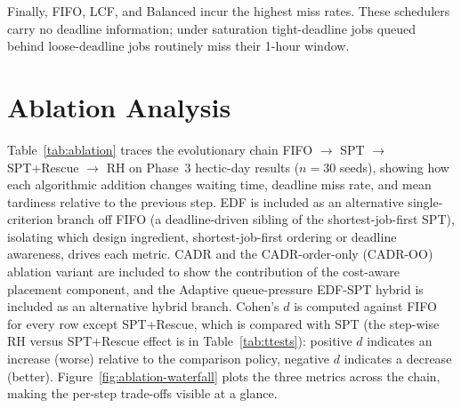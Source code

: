 {Finally, FIFO, LCF, and Balanced incur the highest miss rates. These schedulers carry no deadline information; under saturation tight-deadline jobs queued behind loose-deadline jobs routinely miss their 1-hour window.

\section{Ablation Analysis}
\label{sec:ablation-analysis}

Table~\ref{tab:ablation} traces the evolutionary chain FIFO $\to$ SPT $\to$ SPT+Rescue $\to$ RH on Phase~3 hectic-day results ($n=30$ seeds), showing how each algorithmic addition changes waiting time, deadline miss rate, and mean tardiness relative to the previous step. EDF is included as an alternative single-criterion branch off FIFO (a deadline-driven sibling of the shortest-job-first SPT), isolating which design ingredient, shortest-job-first ordering or deadline awareness, drives each metric. CADR and the CADR-order-only (CADR-OO) ablation variant are included to show the contribution of the cost-aware placement component, and the Adaptive queue-pressure EDF-SPT hybrid is included as an alternative hybrid branch. Cohen's $d$ is computed against FIFO for every row except SPT+Rescue, which is compared with SPT (the step-wise RH versus SPT+Rescue effect is in Table~\ref{tab:ttests}): positive $d$ indicates an increase (worse) relative to the comparison policy, negative $d$ indicates a decrease (better). Figure~\ref{fig:ablation-waterfall} plots the three metrics across the chain, making the per-step trade-offs visible at a glance.

\begin{table}[htbp]
\centering
\caption[Ablation analysis: evolutionary chain]{Ablation analysis: evolutionary chain on Phase~3 hectic day ($n=30$ seeds, $C_{\max}=5$, $\sim$950 jobs/day). Cohen's $d$ for SPT, EDF, RH, CADR, and Adaptive is relative to FIFO; for SPT+Rescue it is relative to SPT. The RH and CADR comparisons against SPT+Rescue are reported in Table~\ref{tab:ttests} and the Phase~3 statistics (Section~\ref{sec:phase-3-statistical-validation}).}
\label{tab:ablation}
\resizebox{\linewidth}{!}{}
\end{table}

}
